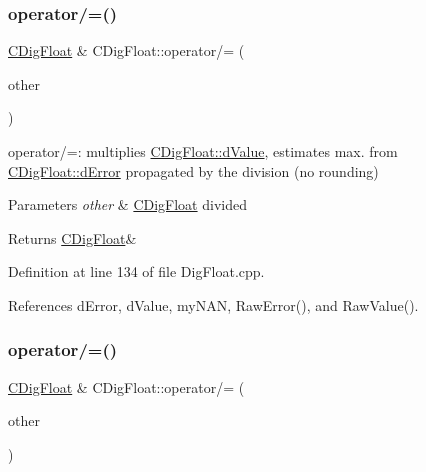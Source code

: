 \subsubsection{\texorpdfstring{operator/=()}{operator/=()}\hspace{0.1cm}{\footnotesize\ttfamily [1/2]}}
{\footnotesize\ttfamily \hyperlink{classCDigFloat}{C\+Dig\+Float} \& C\+Dig\+Float\+::operator/= (\begin{DoxyParamCaption}\item[{const \hyperlink{classCDigFloat}{C\+Dig\+Float} \&}]{other }\end{DoxyParamCaption})}



operator/=\+: multiplies \hyperlink{classCDigFloat_a4bbe69e30dd4e20527362493aa9aaf96}{C\+Dig\+Float\+::d\+Value}, estimates max. from \hyperlink{classCDigFloat_a25eb3782d1e727ff007a48f8308e3d4d}{C\+Dig\+Float\+::d\+Error} propagated by the division (no rounding) 


\begin{DoxyParams}{Parameters}
{\em other} & \hyperlink{classCDigFloat}{C\+Dig\+Float} divided \\
\hline
\end{DoxyParams}
\begin{DoxyReturn}{Returns}
\hyperlink{classCDigFloat}{C\+Dig\+Float}\& 
\end{DoxyReturn}


Definition at line 134 of file Dig\+Float.\+cpp.



References d\+Error, d\+Value, my\+N\+AN, Raw\+Error(), and Raw\+Value().

\mbox{\label{classCDigFloat_ab6531a2016f5cc631cc92719ffc06385}} 
\subsubsection{\texorpdfstring{operator/=()}{operator/=()}\hspace{0.1cm}{\footnotesize\ttfamily [2/2]}}
{\footnotesize\ttfamily \hyperlink{classCDigFloat}{C\+Dig\+Float} \& C\+Dig\+Float\+::operator/= (\begin{DoxyParamCaption}\item[{const double}]{other }\end{DoxyParamCaption})}



